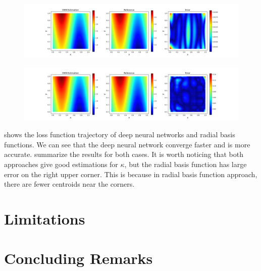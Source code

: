 \documentclass[3p,preprint,12pt]{elsarticle}
\begin{document}
\begin{figure}[htpb]
    \centering
    \includegraphics[width=1.0\textwidth]{figures/combine_nn.png}
    \caption{}
    \label{fig:nn}
\end{figure}

\begin{figure}[htpb]
    \centering
    \includegraphics[width=1.0\textwidth]{figures/combine_rbf.png}
    \caption{}
    \label{fig:rbf}
\end{figure}

 shows the loss function trajectory of deep neural networks and radial basis functions. We can see that the deep neural network converge faster and is more accurate.  summarize the results for both cases. It is worth noticing that both approaches give good estimations for $\kappa$, but the radial basis function has large error on the right upper corner. This is because in radial basis function approach, there are fewer centroids near the corners.  

\section{Limitations}


\section{Concluding Remarks}
\end{document}

